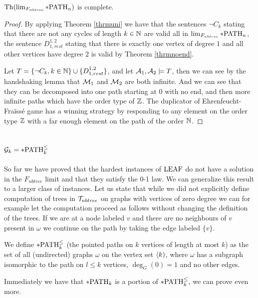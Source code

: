 \begin{crll}\label{crllpPATH}
$\text{Th}(\lim_{F_{nbtree}}*\text{PATH}_n)$ is complete.
\end{crll}
\begin{proof}
By applying Theorem \ref{thrmuni} we have that the sentences $\lnot C_k$ stating that there are not any cycles of length $k\in\mathbb{N}$ are valid all in $\lim_{F_{nbtree}}*\text{PATH}_n$, the sentence $D^{1,2}_{1,rest}$ stating that there is exactly one vertex of degree $1$ and all other vertices have degree $2$ is valid by Theorem \ref{thrmnoend}. 

Let $T=\{\lnot C_k,k\in\mathbb{N}\}\cup\{D_{1,rest}^{1,2}\}$, and let $\mathcal{A}_1,\mathcal{A}_2\models T$, then we can see by the handshaking lemma that $\mathcal{M}_1$ and $\mathcal{M}_2$ are both infinite. And we can see that they can be decomposed into one path starting at $0$ with no end, and then more infinite paths which have the order type of $\mathbb{Z}$. The duplicator of Ehrenfeucht-Fraïssé game has a winning strategy by responding to any element on the order type $\mathbb{Z}$ with a far enough element on the path of the order $\mathbb{N}$.
\end{proof}

\section{\texorpdfstring{$\mathcal{G}_k=*\text{PATH}^\leq_k$}{Gk=*PATHlk}}

So far we have proved that the hardest instances of $\text{LEAF}$ do not have a solution in the $F_{nbtree}$ limit and that they satisfy the 0-1 law. We can generalize this result to a larger class of instances. Let us state that while we did not explicitly define computation of trees in $\mathcal{T}_{nbtree}$ on graphs with vertices of zero degree we can for example let the computation proceed as follows without changing the definition of the trees. If we are at a node labeled $v$ and there are no neighbours of $v$ present in $\omega$ we continue on the path by taking the edge labeled $\{v\}$.

\begin{defi}
We define $*\text{PATH}^\leq_k$ (the pointed paths on $k$ vertices of length at most $k$) as the set of all (undirected) graphs $\omega$ on the vertex set $\langle k)$, where $\omega$ has a subgraph isomorphic to the path on $l\leq k$ vertices, $\deg_G(0)=1$ and no other edges.
\end{defi}

Immediately we have that $*\text{PATH}_k$ is a portion of $*\text{PATH}^\leq_k,$ we can prove even more.

